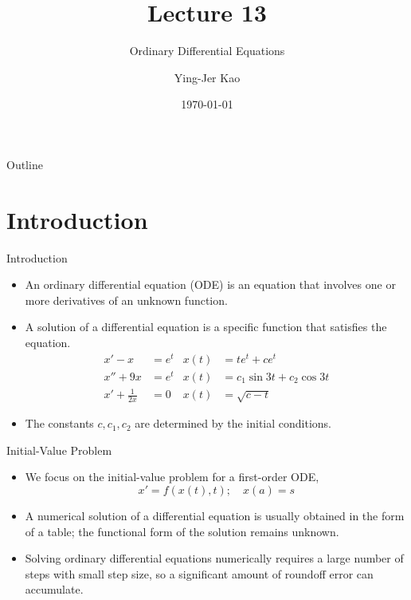 \documentclass{beamer}
\title[Ordinary Differential Equations] %
{Lecture 13}
\subtitle
{Ordinary Differential Equations} %
\author[Ying-Jer Kao] %
{Ying-Jer Kao}
\institute[National Taiwan University] %
{
  Department of Physics\\
 National Taiwan University
  }
\date[Numerical Analysis and Programming] %
{\today}
\newcommand{\beforeverb}{\footnotesize}
\newcommand{\afterverb}{\normalsize}
\begin{document}
\begin{frame}
  \titlepage
\end{frame}

\begin{frame}{Outline}
  \tableofcontents
\end{frame}



\section[Introduction]{Introduction}
\begin{frame}{Introduction}
\begin{itemize}
\item An \alert{ordinary differential equation} (ODE) is an equation that involves one or more derivatives of an unknown function. 
\item A \alert{solution} of a differential equation is a specific function that satisfies the equation.
\begin{align*}
x'-x&=e^t &x(t)&=te^t + c e^t\\
x''+9x&=e^t&x(t)&=c_1\sin3t+c_2 \cos 3t\\
x'+\frac{1}{2x}&=0 &x(t)&=\sqrt{c-t}
\end{align*}
\item The constants $c, c_1, c_2$ are determined by the \alert{initial conditions}. 
 \end{itemize}
\end{frame}

\begin{frame}{Initial-Value Problem}
\begin{itemize}
\item We focus on the initial-value problem for a \alert{first-order} ODE, 
\[
x'=f(x(t),t); \quad x(a)=s
\]
\afterverb 
\item A numerical solution of a differential equation is usually obtained in the form of a \alert{table}; the functional form of the solution remains unknown.
\item Solving ordinary differential equations numerically requires a \alert{large number of steps} with \alert{small step size}, so a significant amount of \alert{roundoff error can accumulate}. 
\end{itemize}
\end{frame}
\end{document}
